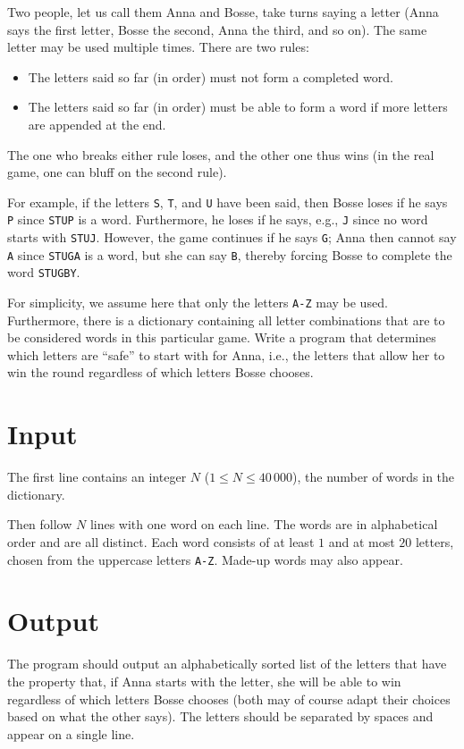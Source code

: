 Two people, let us call them Anna and Bosse, take turns saying a letter (Anna says the first letter, Bosse the second, Anna the third, and so on). The same letter may be used multiple times. There are two rules:

\begin{itemize}
	\item The letters said so far (in order) must not form a completed word.
	\item The letters said so far (in order) must be able to form a word if more letters are appended at the end.
\end{itemize}

The one who breaks either rule loses, and the other one thus wins (in the real game, one can bluff on the second rule).

For example, if the letters \texttt{S}, \texttt{T}, and \texttt{U} have been said, then Bosse loses if he says \texttt{P} since \texttt{STUP} is a word. Furthermore, he loses if he says, e.g., \texttt{J} since no word starts with \texttt{STUJ}. However, the game continues if he says \texttt{G}; Anna then cannot say \texttt{A} since \texttt{STUGA} is a word, but she can say \texttt{B}, thereby forcing Bosse to complete the word \texttt{STUGBY}.

For simplicity, we assume here that only the letters \texttt{A-Z} may be used. Furthermore, there is a dictionary containing all letter combinations that are to be considered words in this particular game. Write a program that determines which letters are ``safe'' to start with for Anna, i.e., the letters that allow her to win the round regardless of which letters Bosse chooses.

\section*{Input}
The first line contains an integer $N$ ($1 \leq N \leq 40\,000$), the number of words in the dictionary.

Then follow $N$ lines with one word on each line.
The words are in alphabetical order and are all distinct.
Each word consists of at least $1$ and at most $20$ letters, chosen from the uppercase letters \texttt{A-Z}.
Made-up words may also appear.

\section*{Output}
The program should output an alphabetically sorted list of the letters that have the property that, if Anna starts with the letter, she will be able to win regardless of which letters Bosse chooses (both may of course adapt their choices based on what the other says). The letters should be separated by spaces and appear on a single line.
